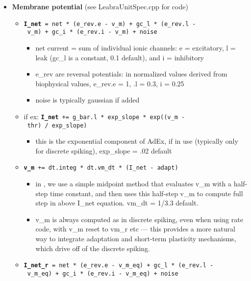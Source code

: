 \begin{itemize}
\tightlist
\item
  \textbf{Membrane potential} (see LeabraUnitSpec.cpp for code)

  \begin{itemize}
  \tightlist
  \item
    \textbf{\texttt{I\_net}}\texttt{\ =\ net\ *\ (e\_rev.e\ -\ v\_m)\ +\ gc\_l\ *\ (e\_rev.l\ -\ v\_m)\ +\ gc\_i\ *\ (e\_rev.i\ -\ v\_m)\ +\ noise}

    \begin{itemize}
    \tightlist
    \item
      net current = sum of individual ionic channels: e = excitatory, l
      = leak (gc\_l is a constant, 0.1 default), and i = inhibitory
    \item
      e\_rev are reversal potentials: in normalized values derived from
      biophysical values, e\_rev.e = 1, .l = 0.3, i = 0.25
    \item
      noise is typically gaussian if added
    \end{itemize}
  \item
    if ex:
    \textbf{\texttt{I\_net}}\texttt{\ +=\ g\_bar.l\ *\ exp\_slope\ *\ exp((v\_m\ -\ thr)\ /\ exp\_slope)}

    \begin{itemize}
    \tightlist
    \item
      this is the exponential component of AdEx, if in use (typically
      only for discrete spiking), exp\_slope = .02 default
    \end{itemize}
  \item
    \textbf{\texttt{v\_m}}\texttt{\ +=\ dt.integ\ *\ dt.vm\_dt\ *\ (I\_net\ -\ adapt)}

    \begin{itemize}
    \tightlist
    \item
      in , we use a simple midpoint method that evaluates v\_m with a
      half-step time constant, and then uses this half-step v\_m to
      compute full step in above I\_net equation. vm\_dt = 1/3.3
      default.
    \item
      v\_m is always computed as in discrete spiking, even when using
      rate code, with v\_m reset to vm\_r etc --- this provides a more
      natural way to integrate adaptation and short-term plasticity
      mechanisms, which drive off of the discrete spiking.
    \end{itemize}
  \item
    \textbf{\texttt{I\_net\_r}}\texttt{\ =\ net\ *\ (e\_rev.e\ -\ v\_m\_eq)\ +\ gc\_l\ *\ (e\_rev.l\ -\ v\_m\_eq)\ +\ gc\_i\ *\ (e\_rev.i\ -\ v\_m\_eq)\ +\ noise}


\end{itemize}
\end{itemize}
